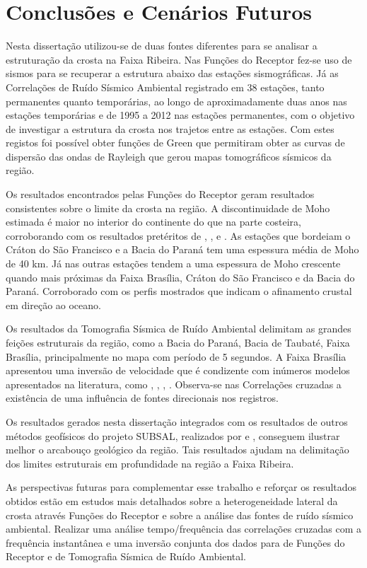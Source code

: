 \chapter{Conclusões e Cenários Futuros}

Nesta dissertação utilizou-se de duas fontes diferentes para se analisar a estruturação da crosta na Faixa Ribeira. Nas Funções do Receptor fez-se uso de sismos para se recuperar a estrutura abaixo das estações sismográficas. Já as Correlações de Ruído Sísmico Ambiental registrado em 38 estações, tanto permanentes quanto temporárias, ao longo de aproximadamente duas anos nas estações temporárias e de 1995 a 2012 nas estações permanentes, com o objetivo de investigar a estrutura da crosta nos trajetos entre as estações. Com estes registos foi possível obter funções de Green que permitiram obter as curvas de dispersão das ondas de Rayleigh que gerou mapas tomográficos sísmicos da região. 

Os resultados encontrados pelas Funções do Receptor geram resultados consistentes sobre o limite da crosta na região. A discontinuidade de Moho estimada é maior no interior do continente do que na parte costeira, corroborando com os resultados pretéritos de \cite{sand_franca_crustal_2004}, \cite{Assumpcao_America_2013}, \cite{Assumpcao_Brazil_2013} e \cite{van_der_meijde_gravity_2013}. As estações que bordeiam o Cráton do São Francisco e a Bacia do Paraná tem uma espessura média de Moho de 40 km. Já nas outras estações tendem a uma espessura de Moho crescente quando mais próximas da Faixa Brasília, Cráton do São Francisco e da Bacia do Paraná. Corroborado com os perfis mostrados que indicam o afinamento crustal em direção ao oceano.

Os resultados da Tomografia Sísmica de Ruído Ambiental delimitam as grandes feições estruturais da região, como a Bacia do Paraná, Bacia de Taubaté, Faixa Brasília, principalmente no mapa com período de 5 segundos. A Faixa Brasília apresentou uma inversão de velocidade que é condizente com inúmeros modelos apresentados na literatura, como \cite{dias_cario_crustal_2006}, \cite{sand_franca_crustal_2004}, \cite{flora_solon_ancient_2013}, \cite{Silva_2014}. Observa-se nas Correlações cruzadas a existência de uma influência de fontes direcionais nos registros. 

Os resultados gerados nesta dissertação integrados com os resultados de outros métodos geofísicos do projeto SUBSAL, realizados por \cite{flora_solon_ancient_2013} e \cite{Silva_2014}, conseguem ilustrar melhor o arcabouço geológico da região. Tais resultados ajudam na delimitação dos limites estruturais em profundidade na região a Faixa Ribeira. 

As perspectivas futuras para complementar esse trabalho e reforçar os resultados obtidos estão em estudos mais detalhados sobre a heterogeneidade lateral da crosta através Funções do Receptor e sobre a análise das fontes de ruído sísmico ambiental. Realizar uma análise tempo/frequência das correlações cruzadas com a frequência instantânea e uma inversão conjunta dos dados para de Funções do Receptor e de Tomografia Sísmica de Ruído Ambiental.